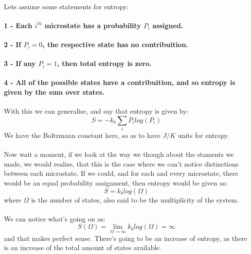 \documentclass[12pt,  letterpaper]{article}
\begin{document}
\paragraph*{}
Lets assume some statements for entropy:
\paragraph*{}
\textbf{1 - Each $i^{th}$ microstate has a probability $P_{i}$ assigned.}
\paragraph*{}
\textbf{2 - If $P_{i} = 0$, the respective state has no contribuition.}
\paragraph*{}
\textbf{3 - If any $P_{i} = 1$, then total entropy is zero.}
\paragraph*{}
\textbf{4 - All of the possible states have a contribuition, and so entropy is given by the sum over states.}
\paragraph*{}
With this we can generalise, and say that entropy is given by:
\begin{equation}
S = -k_{b}\sum_{i} P_{i}log(P_{i})
\end{equation}
We have the Boltzmann constant here, so as to have $J/K$ units for entropy.
\paragraph*{}
Now wait a moment, if we look at the way we though about the staments we made, we would realise, that this is the case where we can't notice distinctions between each microstate. If we could, and for each and every microstate, there would be an equal probability assignment, then entropy would be given as:
\begin{equation}
S = k_{b}log(\Omega)
\end{equation}
where $\Omega$ is the number of states, also said to be the multiplicity of the system.\paragraph*{}
We can notice what's going on as:
\begin{equation}
S(\Omega) = \lim_{\Omega\to\infty} k_{b}log(\Omega) = \infty
\end{equation}
and that makes perfect sense. There's going to be an increase of entropy, as there is an increase of the total amount of states available.
\end{document}

